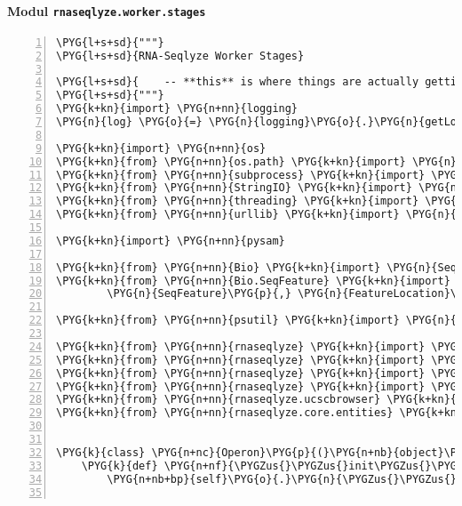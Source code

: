 \paragraph{Modul \texttt{rnaseqlyze.worker.stages}}
\label{rnaseqlyze-pdf:modul-rnaseqlyze-worker-stages}
\begin{Verbatim}[commandchars=\\\{\},numbers=left,firstnumber=1,stepnumber=5]
\PYG{l+s+sd}{"""}
\PYG{l+s+sd}{RNA-Seqlyze Worker Stages}

\PYG{l+s+sd}{    -- **this** is where things are actually getting done! :-)}
\PYG{l+s+sd}{"""}
\PYG{k+kn}{import} \PYG{n+nn}{logging}
\PYG{n}{log} \PYG{o}{=} \PYG{n}{logging}\PYG{o}{.}\PYG{n}{getLogger}\PYG{p}{(}\PYG{n}{\PYGZus{}\PYGZus{}name\PYGZus{}\PYGZus{}}\PYG{p}{)}

\PYG{k+kn}{import} \PYG{n+nn}{os}
\PYG{k+kn}{from} \PYG{n+nn}{os.path} \PYG{k+kn}{import} \PYG{n}{join}\PYG{p}{,} \PYG{n}{exists}\PYG{p}{,} \PYG{n}{isdir}\PYG{p}{,} \PYG{n}{relpath}
\PYG{k+kn}{from} \PYG{n+nn}{subprocess} \PYG{k+kn}{import} \PYG{n}{Popen}\PYG{p}{,} \PYG{n}{PIPE}
\PYG{k+kn}{from} \PYG{n+nn}{StringIO} \PYG{k+kn}{import} \PYG{n}{StringIO}
\PYG{k+kn}{from} \PYG{n+nn}{threading} \PYG{k+kn}{import} \PYG{n}{Thread}
\PYG{k+kn}{from} \PYG{n+nn}{urllib} \PYG{k+kn}{import} \PYG{n}{quote}

\PYG{k+kn}{import} \PYG{n+nn}{pysam}

\PYG{k+kn}{from} \PYG{n+nn}{Bio} \PYG{k+kn}{import} \PYG{n}{SeqIO}
\PYG{k+kn}{from} \PYG{n+nn}{Bio.SeqFeature} \PYG{k+kn}{import} \PYGZbs{}
        \PYG{n}{SeqFeature}\PYG{p}{,} \PYG{n}{FeatureLocation}\PYG{p}{,} \PYG{n}{ExactPosition}

\PYG{k+kn}{from} \PYG{n+nn}{psutil} \PYG{k+kn}{import} \PYG{n}{cpu\PYGZus{}percent}

\PYG{k+kn}{from} \PYG{n+nn}{rnaseqlyze} \PYG{k+kn}{import} \PYG{n}{efetch}
\PYG{k+kn}{from} \PYG{n+nn}{rnaseqlyze} \PYG{k+kn}{import} \PYG{n}{galaxy}
\PYG{k+kn}{from} \PYG{n+nn}{rnaseqlyze} \PYG{k+kn}{import} \PYG{n}{ucscbrowser}
\PYG{k+kn}{from} \PYG{n+nn}{rnaseqlyze} \PYG{k+kn}{import} \PYG{n}{transterm}\PYG{p}{,} \PYG{n}{gb2ptt}
\PYG{k+kn}{from} \PYG{n+nn}{rnaseqlyze.ucscbrowser} \PYG{k+kn}{import} \PYG{n}{BAMTrack}\PYG{p}{,} \PYG{n}{BigWigTrack}\PYG{p}{,} \PYG{n}{BigBedTrack}
\PYG{k+kn}{from} \PYG{n+nn}{rnaseqlyze.core.entities} \PYG{k+kn}{import} \PYG{n}{GalaxyDataset}


\PYG{k}{class} \PYG{n+nc}{Operon}\PYG{p}{(}\PYG{n+nb}{object}\PYG{p}{)}\PYG{p}{:}
    \PYG{k}{def} \PYG{n+nf}{\PYGZus{}\PYGZus{}init\PYGZus{}\PYGZus{}}\PYG{p}{(}\PYG{n+nb+bp}{self}\PYG{p}{,} \PYG{o}{*}\PYG{o}{*}\PYG{n}{kwargs}\PYG{p}{)}\PYG{p}{:}
        \PYG{n+nb+bp}{self}\PYG{o}{.}\PYG{n}{\PYGZus{}\PYGZus{}dict\PYGZus{}\PYGZus{}}\PYG{o}{.}\PYG{n}{update}\PYG{p}{(}\PYG{n}{kwargs}\PYG{p}{)}


\end{Verbatim}
